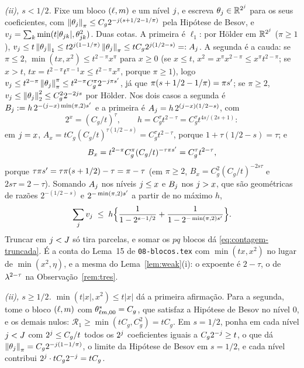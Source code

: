 \documentclass[11pt,a4paper]{article}
\begin{document}
\emph{(ii), $s < 1/2$.} Fixe um bloco $(\ell,m)$ e um nível $j$, e escreva
$\theta_{j} \in \mathbb{R}^{2^{j}}$ para os seus coeficientes, com
$\left\lVert \theta_{j} \right\rVert_{\pi} \le C_{g}2^{-j(s+1/2-1/\pi)}$ pela Hipótese de
Besov, e $v_{j} = \sum_{k}\min(t|\theta_{jk}|,\theta_{jk}^{2})$.
Duas cotas. A primeira é $\ell_{1}$: por Hölder em $\mathbb{R}^{2^{j}}$
($\pi \ge 1$), $v_{j} \le t\left\lVert \theta_{j} \right\rVert_{1} \le
t2^{j(1-1/\pi)}\left\lVert \theta_{j} \right\rVert_{\pi} \le tC_{g}2^{j(1/2-s)}
=: A_{j}$. A segunda é a cauda: se $\pi \le 2$, $\min(tx,x^{2}) \le
t^{2-\pi}x^{\pi}$ para $x \ge 0$ (se $x \le t$, $x^{2} =
x^{\pi}x^{2-\pi} \le x^{\pi}t^{2-\pi}$; se $x > t$, $tx =
t^{2-\pi}t^{\pi-1}x \le t^{2-\pi}x^{\pi}$, porque $\pi \ge 1$), logo
$v_{j} \le t^{2-\pi}\left\lVert \theta_{j} \right\rVert_{\pi}^{\pi} \le
t^{2-\pi}C_{g}^{\pi}2^{-j\pi s'}$, já que $\pi(s+1/2-1/\pi) = \pi s'$;
se $\pi \ge 2$, $v_{j} \le \left\lVert \theta_{j} \right\rVert_{2}^{2} \le
C_{g}^{2}2^{-2j s}$ por Hölder. Nos dois casos a segunda é
$B_{j} := h\,2^{-(j - x)\min(\pi,2)s'}$ e a primeira é $A_{j} =
h\,2^{(j-x)(1/2-s)}$, com
\[
  2^{x} = (C_{g}/t)^{\tau},
  \qquad
  h = C_{g}^{\tau}t^{2-\tau} = C_{g}^{\tau}t^{4s/(2s+1)}:
\]
em $j = x$, $A_{x} = tC_{g}(C_{g}/t)^{\tau(1/2-s)} = C_{g}^{\tau}t^{2-\tau}$,
porque $1 + \tau(1/2-s) = \tau$; e
\[
  B_{x} = t^{2-\pi}C_{g}^{\pi}(C_{g}/t)^{-\tau\pi s'} = C_{g}^{\tau}t^{2-\tau},
\]
porque $\tau\pi s' =
\tau\pi(s+1/2) - \tau = \pi - \tau$ (em $\pi \ge 2$, $B_{x} =
C_{g}^{2}(C_{g}/t)^{-2s\tau}$ e $2s\tau = 2 - \tau$). Somando $A_{j}$ nos
níveis $j \le x$ e $B_{j}$ nos $j > x$, que são geométricas de razões
$2^{-(1/2-s)}$ e $2^{-\min(\pi,2)s'}$ a partir de no máximo $h$,
\[
  \sum_{j}v_{j} \;\le\; h\Bigl\{\frac{1}{1 - 2^{s-1/2}} +
  \frac{1}{1 - 2^{-\min(\pi,2)s'}}\Bigr\}.
\]
Truncar em $j < J$ só tira parcelas, e somar
os $pq$ blocos dá \eqref{eq:contagem-truncada}. É a conta do Lema~15 de
\texttt{08-blocos.tex} com $\min(tx,x^{2})$ no lugar de $\min(x^{2},\eta)$,
e a mesma do Lema~\ref{lem:weak}(i): o expoente é $2 - \tau$, o de
$\lambda^{2-\tau}$ na Observação~\ref{rem:tres}.

\emph{(ii), $s \ge 1/2$.} $\min(t|x|,x^{2}) \le t|x|$ dá a primeira
afirmação. Para a segunda, tome o bloco $(\ell,m)$ com
$\theta^{*}_{\ell m,00} = C_{g}$, que satisfaz a Hipótese de Besov no nível
$0$, e os demais nulos: $\mathcal{R}_{1} \ge \min(tC_{g},C_{g}^{2}) = tC_{g}$.
Em $s = 1/2$, ponha em cada nível $j < J$ com $2^{j} \le C_{g}/t$ todos
os $2^{j}$ coeficientes iguais a $C_{g}2^{-j} \ge t$, o que dá
$\left\lVert \theta_{j} \right\rVert_{\pi} = C_{g}2^{-j(1-1/\pi)}$, o limite da Hipótese
de Besov em $s = 1/2$, e cada nível contribui $2^{j}\cdot tC_{g}2^{-j} =
tC_{g}$.
\end{document}
